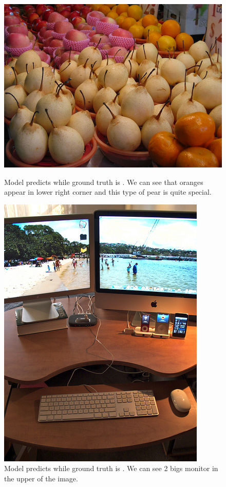 \begin{figure}[!ht]
	\centering
	\begin{minipage}[t]{0.45\linewidth}
		\includegraphics[scale=0.35]{./figures/testFail1}
		\caption{Model predicts  while ground truth is . We can see that oranges appear in lower right corner and this type of pear is quite special.}
		\label{fig:testFail1}
	\end{minipage}
	\quad
	\begin{minipage}[t]{0.45\linewidth}
		\includegraphics[scale=0.45]{./figures/testFail2}
		\caption{Model predicts  while ground truth is . We can see 2 bigs monitor in the upper of the image.}
		\label{fig:testFail2}
	\end{minipage}
\end{figure}

